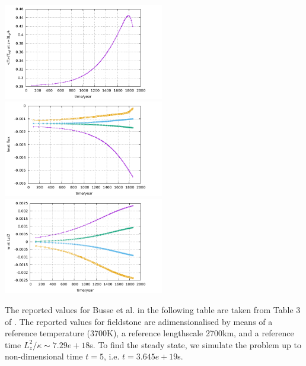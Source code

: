 \begin{center}
\includegraphics[width=7cm]{python_codes/fieldstone_20/images/Tm.pdf}\\
\includegraphics[width=7cm]{python_codes/fieldstone_20/images/hf.pdf}
\includegraphics[width=7cm]{python_codes/fieldstone_20/images/wmid.pdf}
\end{center}


The reported values for Busse et al. in the following table are taken from Table 3 of \cite{bucc93}.
The reported values for fieldstone are adimensionalised by means of a reference temperature (3700K),
a reference lengthscale 2700km, and a reference time $L_z^2/\kappa\sim 7.29e+18$s. 
To find the steady state, we simulate the problem up to non-dimensional time $t=5$, 
i.e. $t=3.645e+19$s.



